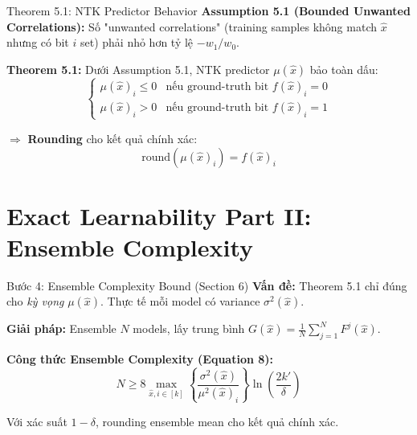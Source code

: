 \begin{frame}{Theorem 5.1: NTK Predictor Behavior}
  \textbf{Assumption 5.1 (Bounded Unwanted Correlations):}
  Số "unwanted correlations" (training samples không match $\hat{x}$ nhưng có bit $i$ set) phải nhỏ hơn tỷ lệ $-w_1/w_0$.

  \vspace{0.3cm}
  \textbf{Theorem 5.1:} Dưới Assumption 5.1, NTK predictor $\mu(\hat{x})$ bảo toàn dấu:
  \[
    \begin{cases}
      \mu(\hat{x})_i \le 0 & \text{nếu ground-truth bit } f(\hat{x})_i = 0 \\
      \mu(\hat{x})_i > 0 & \text{nếu ground-truth bit } f(\hat{x})_i = 1
    \end{cases}
  \]

  $\Rightarrow$ \textbf{Rounding} cho kết quả chính xác:
  \[
    \text{round}(\mu(\hat{x})_i) = f(\hat{x})_i
  \]
\end{frame}

\section{Exact Learnability Part II: Ensemble Complexity}

\begin{frame}{Bước 4: Ensemble Complexity Bound (Section 6)}
  \textbf{Vấn đề:} Theorem 5.1 chỉ đúng cho \emph{kỳ vọng} $\mu(\hat{x})$. Thực tế mỗi model có variance $\sigma^2(\hat{x})$.

  \vspace{0.3cm}
  \textbf{Giải pháp:} Ensemble $N$ models, lấy trung bình $G(\hat{x}) = \frac{1}{N}\sum_{j=1}^N F^j(\hat{x})$.

  \vspace{0.3cm}
  \textbf{Công thức Ensemble Complexity (Equation 8):}
  \[
    N \ge 8 \max_{\hat{x}, i \in [k]} \left\{ \frac{\sigma^2(\hat{x})}{\mu^2(\hat{x})_i} \right\} \ln\left(\frac{2k'}{\delta}\right)
  \]

  Với xác suất $1 - \delta$, rounding ensemble mean cho kết quả chính xác.
\end{frame}

